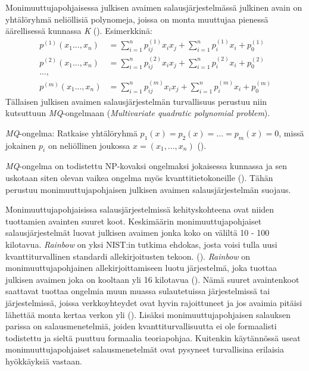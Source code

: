 Monimuuttujapohjaisessa julkisen avaimen salausjärjestelmässä julkinen avain on yhtälöryhmä neliöllisiä polynomeja, joissa on monta muuttujaa pienessä äärellisessä kunnassa \emph{K} (\cite{8012305}). Esimerkkinä: 
    \begin{align*}
        p^{(1)}(x_{1}...,x_{n}) &= \sum_{i=1}^{n} p_{ij}^{(1)}x_{i}x_ {j}+\sum_{i=1}^{n}p_ {i}^{(1)}x_{i}+p_ {0}^{(1)} \\
        p^{(2)}(x_{1}...,x_{n}) &= \sum_{i=1}^{n} p_{ij}^{(2)}x_{i}x_ {j}+\sum_{i=1}^{n}p_ {i}^{(2)}x_{i}+p_ {0}^{(2)} \\
        ..., \\
        p^{(m)}(x_{1}...,x_{n}) &= \sum_{i=1}^{n} p_{ij}^{(m)}x_{i}x_ {j}+\sum_{i=1}^{n}p_ {i}^{(m)}x_{i}+p_ {0}^{(m)}
    \end{align*}
Tällaisen julkisen avaimen salausjärjestelmän turvallisuus perustuu niin kutsuttuun \emph{MQ}-ongelmaan (\emph{Multivariate quadratic polynomial problem}).

\emph{MQ}-ongelma: Ratkaise yhtälöryhmä $p_{1}(x) = p_{2}(x) = ... = p_ {m}(x) = 0$, missä jokainen $p_{i}$ on neliöllinen joukossa $x = (x_{1}, ..., x_{n})$ (\cite{Ding2009}).

\emph{MQ}-ongelma on todistettu NP-kovaksi ongelmaksi jokaisessa kunnassa ja sen uskotaan siten olevan vaikea ongelma myös kvanttitietokoneille (\cite{8012305}). Tähän perustuu monimuuttujapohjaisen julkisen avaimen salausjärjestelmän suojaus.

Monimuuttujapohjaisissa salausjärjestelmissä kehityskohteena ovat niiden tuottamien avainten suuret koot. Keskimäärin monimuuttujapohjaiset salausjärjestelmät luovat julkisen avaimen jonka koko on väliltä 10 - 100 kilotavua. \emph{Rainbow} on yksi NIST:in tutkima ehdokas, josta voisi tulla uusi kvanttiturvallinen standardi allekirjoitusten tekoon. (\cite{alagic2020status}). \emph{Rainbow} on monimuuttujapohjainen allekirjoittamiseen luotu järjestelmä, joka tuottaa julkisen avaimen joka on kooltaan yli 16 kilotavua (\cite{Ding2009}). Nämä suuret avaintenkoot saattavat tuottaa ongelmia muun muassa sulautetuissa järjestelmissä tai järjestelmissä, joissa verkkoyhteydet ovat hyvin rajoittuneet ja jos avaimia pitäisi lähettää monta kertaa verkon yli (\cite{8012305}). Lisäksi monimuuttujapohjaisen salauksen parissa on salausmenetelmiä, joiden kvanttiturvallisuutta ei ole formaalisti todistettu ja sieltä puuttuu formaalia teoriapohjaa. Kuitenkin käytännössä useat monimuuttujapohjaiset salausmenetelmät ovat pysyneet turvallisina erilaisia hyökkäyksiä vastaan.

